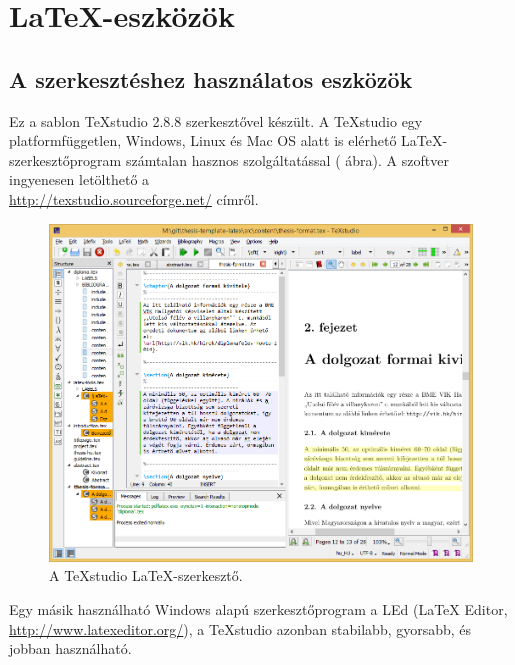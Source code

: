 \chapter{\LaTeX-eszközök}\label{sect:LatexTools}
\section{A szerkesztéshez használatos eszközök}
Ez a sablon TeXstudio 2.8.8 szerkesztővel készült. A TeXstudio egy platformfüggetlen, Windows, Linux és Mac OS alatt is elérhető \LaTeX-szerkesztőprogram számtalan hasznos szolgáltatással ( ábra). A szoftver ingyenesen letölthető a\\\url{http://texstudio.sourceforge.net/} címről.

\begin{figure}[!ht]
\centering
\includegraphics[width=150mm, keepaspectratio]{figures/TeXstudio.png}
\caption{A TeXstudio \LaTeX-szerkesztő.} 
\label{fig:TeXstudio}
\end{figure}

Egy másik használható Windows alapú szerkesztőprogram a LEd (LaTeX Editor,\\\url{http://www.latexeditor.org/}), a TeXstudio azonban stabilabb, gyorsabb, és jobban használható.


